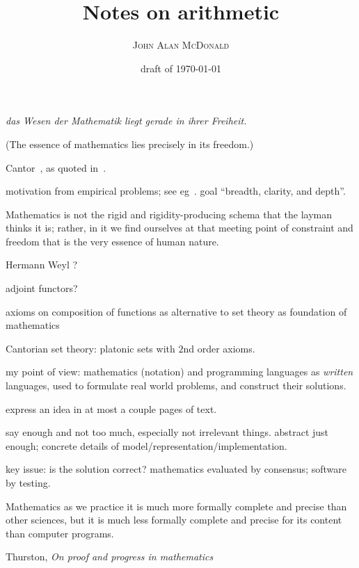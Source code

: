 \documentclass[11pt,openany]{book}
\title{Notes on arithmetic}
\author{\textsc{John Alan McDonald}}
\date{draft of \today}
\begin{document}
\maketitle


% 

\setcounter{baseSectionLevel}{6}
\epigraph{
\textsl{das Wesen der Mathematik liegt gerade in ihrer Freiheit.}
\par
(The essence of mathematics lies precisely in its freedom.)}%
{Cantor~\cite{Cantor:1883:ManifoldInfinity},
as quoted in~\cite{Ferreiros:2007:Labyrinth}.}

motivation from empirical problems; 
see eg~\cite{MacLane:1981:MathModels}.
goal ``breadth, clarity, and depth''.

\epigraph{
Mathematics is not the rigid and rigidity-producing schema 
that the layman thinks it is; 
rather, in it we find ourselves at that meeting point 
of constraint and freedom 
that is the very essence of human nature.}%
{Hermann Weyl ?}


adjoint functors?

axioms on composition of functions as alternative to set theory
as foundation of mathematics

Cantorian set theory: platonic sets with $2$nd order axioms.

my point of view: 
mathematics (notation) and programming languages
as \textit{written} languages,
used to formulate real world problems,
and construct their solutions.

express an idea in at most a couple pages of text.

say enough and not too much, especially not irrelevant things.
abstract just enough; 
concrete details of model/representation/implementation.

key issue: is the solution correct?
mathematics evaluated by consensus;
software by testing.

\epigraph{Mathematics as we practice it is much more formally 
complete and precise than
other sciences, but it is much less formally complete and precise 
for its content
than computer programs.}%
{Thurston, \textit{On proof and progress in mathematics}~\cite{Thurston:1994:Proof}}
\end{document}

